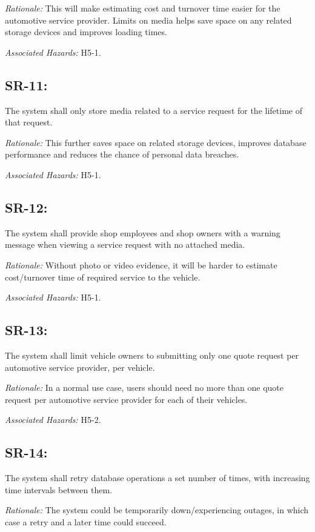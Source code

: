 \documentclass{article}
\begin{document}
\emph{Rationale: }This will make estimating cost and turnover time easier for the automotive service provider. Limits on media helps save space on any related storage devices and improves loading times.

\emph{Associated Hazards: }H5-1.

\subsection*{SR-11:}
The system shall only store media related to a service request for the lifetime of that request.

\emph{Rationale: }This further saves space on related storage devices, improves database performance and reduces the chance of personal data breaches.

\emph{Associated Hazards: }H5-1.

\subsection*{SR-12:}
The system shall provide shop employees and shop owners with a warning message when viewing a service request with no attached media.

\emph{Rationale: }Without photo or video evidence, it will be harder to estimate cost/turnover time of required service to the vehicle.

\emph{Associated Hazards: }H5-1.

\subsection*{SR-13:}
The system shall limit vehicle owners to submitting only one quote request per automotive service provider, per vehicle.

\emph{Rationale: }In a normal use case, users should need no more than one quote request per automotive service provider for each of their vehicles.

\emph{Associated Hazards: }H5-2.

\subsection*{SR-14:}
The system shall retry database operations a set number of times, with increasing time intervals between them.

\emph{Rationale: }The system could be temporarily down/experiencing outages, in which case a retry and a later time could succeed.
\end{document}
